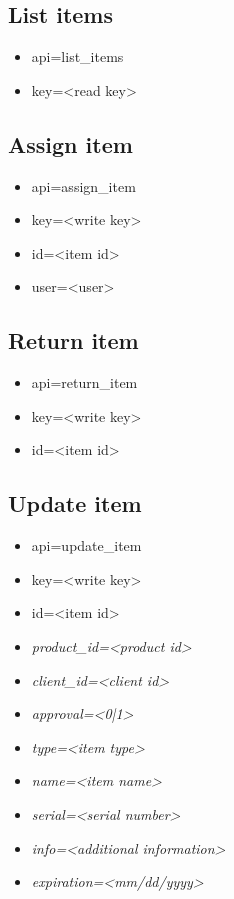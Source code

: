 \documentclass[11pt]{article}
\begin{document}
\subsection{List items}

\begin{itemize}
\item api=list\_items
\item key=<read key>
\end{itemize}

\subsection{Assign item}

\begin{itemize}
\item api=assign\_item
\item key=<write key>
\item id=<item id>
\item user=<user>
\end{itemize}

\subsection{Return item}

\begin{itemize}
\item api=return\_item
\item key=<write key>
\item id=<item id>
\end{itemize}

\subsection{Update item}

\begin{itemize}
\item api=update\_item
\item key=<write key>
\item id=<item id>
\item \textit{product\_id=<product id>}
\item \textit{client\_id=<client id>}
\item \textit{approval=<0|1>}
\item \textit{type=<item type>}
\item \textit{name=<item name>}
\item \textit{serial=<serial number>}
\item \textit{info=<additional information>}
\item \textit{expiration=<mm/dd/yyyy>}
\end{itemize}
\end{document}
